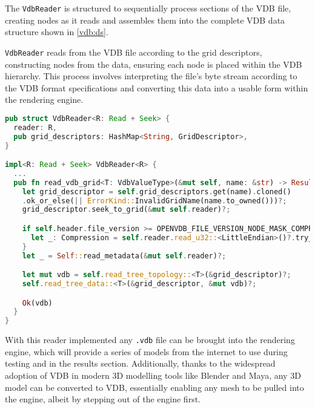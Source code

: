 The \texttt{VdbReader} is structured to sequentially process sections of the VDB file, creating nodes as it reads and assembles them into the complete VDB data structure shown in \cref{vdb:ds}.

\texttt{VdbReader} reads from the VDB file according to the grid descriptors, constructing nodes from the data, ensuring each node is placed within the VDB hierarchy. This process involves interpreting the file's byte stream according to the VDB format specifications and converting this data into a usable form within the rendering engine.

\begin{lstlisting}[language=rust, captionpos=b, caption={
    \texttt{VdbReader} definition: \texttt{reader} is the file stream handler, \texttt{grid\_descriptors} hold the metadata given in \cref{file:meta}.
    \texttt{VdbReader} implementation: The method \texttt{read\_vdb\_grid} is shown, which is called after the file header is handled, and returns a VDB if the file contents match the expectations from the header; if not, it returns an error.
  }, label={vdb:read}]
pub struct VdbReader<R: Read + Seek> {
  reader: R,
  pub grid_descriptors: HashMap<String, GridDescriptor>,
}

impl<R: Read + Seek> VdbReader<R> {
  ...
  pub fn read_vdb_grid<T: VdbValueType>(&mut self, name: &str) -> Result<VDB<T>> {
    let grid_descriptor = self.grid_descriptors.get(name).cloned()
    .ok_or_else(|| ErrorKind::InvalidGridName(name.to_owned()))?;
    grid_descriptor.seek_to_grid(&mut self.reader)?;

    if self.header.file_version >= OPENVDB_FILE_VERSION_NODE_MASK_COMPRESSION {
      let _: Compression = self.reader.read_u32::<LittleEndian>()?.try_into()?;
    }
    let _ = Self::read_metadata(&mut self.reader)?;

    let mut vdb = self.read_tree_topology::<T>(&grid_descriptor)?;
    self.read_tree_data::<T>(&grid_descriptor, &mut vdb)?;

    Ok(vdb)
  }
}
\end{lstlisting}

With this reader implemented any \texttt{.vdb} file can be brought into the rendering engine, which will provide a series of models from the internet to use during testing and in the results section. Additionally, thanks to the widespread adoption of VDB in modern 3D modelling tools like Blender and Maya, any 3D model can be converted to VDB, essentially enabling any mesh to be pulled into the engine, albeit by stepping out of the engine first.

